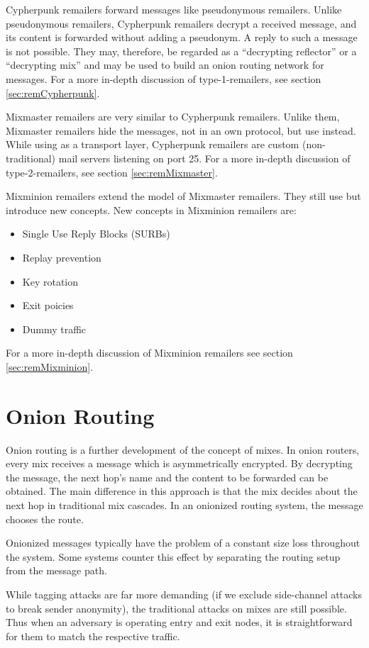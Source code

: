 Cypherpunk remailers forward messages like pseudonymous remailers. Unlike pseudonymous remailers, Cypherpunk remailers decrypt a received message, and its content is forwarded without adding a pseudonym. A reply to such a message is not possible. They may, therefore, be regarded as a ``decrypting reflector'' or a ``decrypting mix'' and may be used to build an onion routing network for messages. For a more in-depth discussion of type-1-remailers, see section  \ref{sec:remCypherpunk}.

Mixmaster remailers are very similar to Cypherpunk remailers. Unlike them, Mixmaster remailers hide the messages, not in an own protocol, but use  instead. While using  as a transport layer, Cypherpunk remailers are custom (non-traditional) mail servers listening on port 25. For a more in-depth discussion of type-2-remailers, see section \ref{sec:remMixmaster}.

Mixminion remailers extend the model of Mixmaster remailers. They still use  but introduce new concepts. New concepts in Mixminion remailers are:
\begin{itemize}
	\item Single Use Reply Blocks (SURBs)
	\item Replay prevention
	\item Key rotation
	\item Exit poicies
	\item Dummy traffic
\end{itemize}
For a more in-depth discussion of Mixminion remailers see section \ref{sec:remMixminion}.


\section{Onion Routing}
Onion routing is a further development of the concept of mixes. In onion routers, every mix receives a message which is asymmetrically encrypted. By decrypting the message, the next hop's name and the content to be forwarded can be obtained. The main difference in this approach is that the mix decides about the next hop in traditional mix cascades. In an onionized routing system, the message chooses the route. 

Onionized messages typically have the problem of a constant size loss throughout the system. Some systems counter this effect by separating the routing setup from the message path.

While tagging attacks are far more demanding (if we exclude side-channel attacks to break sender anonymity), the traditional attacks on mixes are still possible. Thus when an adversary is operating entry and exit nodes, it is straightforward for them to match the respective traffic.

